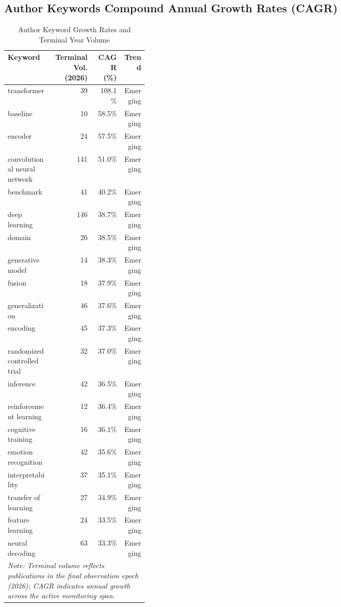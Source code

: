 \subsection{Author Keywords Compound Annual Growth Rates (CAGR)}
\begin{table}[htbp]
\caption{Author Keyword Growth Rates and Terminal Year Volume}
\label{tab:keywords_cagr}
\small
\setlength{\tabcolsep}{4pt}
\begin{tabular}{p{0.32\linewidth} r r r}
\toprule
\textbf{Keyword} & \textbf{Terminal Vol. (2026)} & \textbf{CAGR (\%)} & \textbf{Trend} \\
\midrule
transformer & 39 & 108.1\% & Emerging \\
baseline & 10 & 58.5\% & Emerging \\
encoder & 24 & 57.5\% & Emerging \\
convolutional neural network & 141 & 51.0\% & Emerging \\
benchmark & 41 & 40.2\% & Emerging \\
deep learning & 146 & 38.7\% & Emerging \\
domain & 26 & 38.5\% & Emerging \\
generative model & 14 & 38.3\% & Emerging \\
fusion & 18 & 37.9\% & Emerging \\
generalization & 46 & 37.6\% & Emerging \\
encoding & 45 & 37.3\% & Emerging \\
randomized controlled trial & 32 & 37.0\% & Emerging \\
inference & 42 & 36.5\% & Emerging \\
reinforcement learning & 12 & 36.4\% & Emerging \\
cognitive training & 16 & 36.1\% & Emerging \\
emotion recognition & 42 & 35.6\% & Emerging \\
interpretability & 37 & 35.1\% & Emerging \\
transfer of learning & 27 & 34.9\% & Emerging \\
feature learning & 24 & 33.5\% & Emerging \\
neural decoding & 63 & 33.3\% & Emerging \\
\bottomrule
\multicolumn{4}{p{0.95\linewidth}}{\scriptsize \textit{Note: Terminal volume reflects publications in the final observation epoch (2026); CAGR indicates annual growth across the active monitoring span.}} \\
\end{tabular}
\end{table}